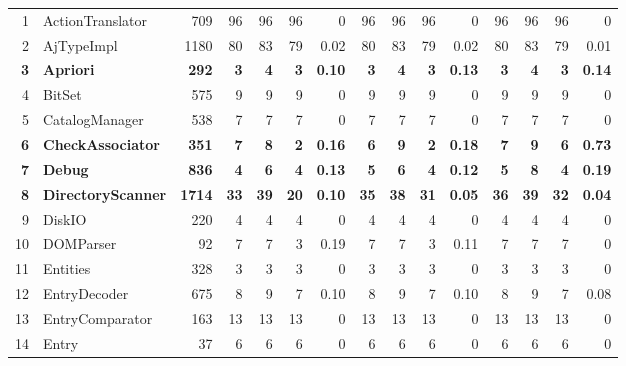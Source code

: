 \documentclass[conference]{IEEEtran}
\begin{document}
\begin{table} [htp!]
{\begin{tabularx}{1 \textwidth}{r l r r r r r r r r r r r r r}
1						& ActionTranslator			&709		& 96		&	96	&	96	& 	0					& 96		& 96 		& 96		& 		0			& 96			& 96			& 96			&	0\\     
2						& AjTypeImpl				&1180		& 80		&	83	&	79	& 	0.02					& 80		& 83 		& 79		& 		0.02			& 80			& 83			& 79			&	0.01\\      
\textbf{3}					& \textbf{Apriori}			&\textbf{292}	& \textbf{3}&	\textbf{4}	&\textbf{3}	& \textbf{0.10}			& \textbf{3}& \textbf{4} 		& \textbf{3}& \textbf{0.13}	& \textbf{3}	& \textbf{4}	& \textbf{3}	&\textbf{0.14}\\      
4						& BitSet					&575		& 9		&	9	&	9	& 	0					& 9		& 9 		& 9		& 		0			& 9			& 9			& 9			&	0\\       
5						& CatalogManager			&538		& 7		&	7	&	7	& 	0					& 7		& 7 		& 7		& 		0			& 7			& 7			& 7			&	0\\    
\textbf{6}					& \textbf{CheckAssociator}	&\textbf{351}	& \textbf{7}	&	\textbf{8}	&	\textbf{2}	& 	\textbf{0.16}					& \textbf{6}		& \textbf{9} 		& \textbf{2}		& 		\textbf{0.18}			& \textbf{7}			& \textbf{9}			& \textbf{6}			&	\textbf{0.73}\\    
\textbf{7}						& \textbf{Debug}					&\textbf{836}		& \textbf{4}		&	\textbf{6}	&	\textbf{4}	& 	\textbf{0.13}					& \textbf{5}		& \textbf{6} 		& \textbf{4}		& 		\textbf{0.12}			& \textbf{5}			& \textbf{8}			& \textbf{4}			&	\textbf{0.19}\\       
\textbf{8}						& \textbf{DirectoryScanner}			&\textbf{1714}		& \textbf{33}		&	\textbf{39}	&	\textbf{20}	& 	\textbf{0.10}					& \textbf{35}		& \textbf{38} 		& \textbf{31}		& 		\textbf{0.05}			& \textbf{36}			& \textbf{39}			& \textbf{32}			&	\textbf{0.04}\\      
9						& DiskIO					&220		& 4		&	4	&	4	& 	0					& 4		& 4 		& 4		& 		0			& 4			& 4			& 4			&	0\\      
10						& DOMParser				&92			& 7		&	7	&	3	& 	0.19					& 7		& 7 		& 3		& 		0.11			& 7			& 7			& 7			&	0\\      
11						& Entities					&328		& 3		&	3	&	3	& 	0					& 3		& 3 		& 3		& 		0			& 3			& 3			& 3			&	0\\      
12						& EntryDecoder			&675		& 8		&	9	&	7	& 	0.10					& 8		& 9 		& 7		& 		0.10			& 8			& 9			& 7			&	0.08\\   
13						& EntryComparator			&163		& 13		&	13	&	13	& 	0					& 13		& 13 		& 13		& 		0			& 13			& 13			& 13			&	0\\      
14						& Entry					&37			& 6		&	6	&	6	& 	0					& 6		& 6 		& 6		& 		0			& 6			& 6			& 6			&	0\\   

\end{tabularx}}
\end{table}
\end{document}
